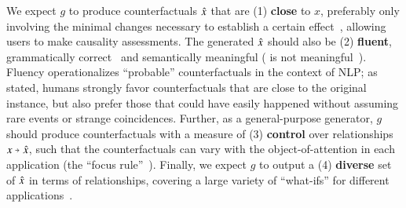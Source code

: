 We expect $g$ to produce counterfactuals $\hat{x}$ that are (1) \textbf{close} to $x$, preferably only involving the minimal changes necessary to establish a certain effect~\cite{pearl2018causal}, allowing users to make causality assessments.
The generated $\hat{x}$ should also be (2) \textbf{fluent}, \ie grammatically correct~\cite{morris2020textattack} and semantically meaningful (\eg {} is not meaningful~\cite{chomsky2002syntactic}).
Fluency operationalizes ``probable'' counterfactuals in the context of NLP;
as \citet{kahneman} stated, humans strongly favor counterfactuals that are close to the original instance, but also prefer those that could have easily happened without assuming rare events or strange coincidences.
Further, as a general-purpose generator, $g$ should produce counterfactuals with a measure of (3) \textbf{control} over relationships $x \veryshortarrow \xp$,  %
such that the counterfactuals can vary with the object-of-attention in each application (the ``focus rule''~\cite{kahneman}).
Finally, %
we expect $g$ to output a (4) \textbf{diverse} set of $\hat{x}$ in terms of relationships, covering a large variety of ``what-ifs'' for different applications~\cite{pearl2018causal}.


